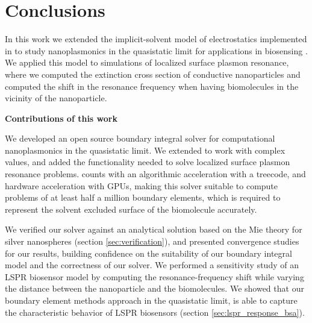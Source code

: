 \chapter{Conclusions}

In this work we extended the implicit-solvent model of electrostatics implemented in \pygbe \cite{CooperClementiBarba2015}
to study nanoplasmonics in the quasistatic limit for applications in biosensing \cite{ClementiETal2017, ClementiETal2019}.
We applied this model to simulations of localized surface plasmon resonance, where we computed the extinction cross section of 
conductive nanoparticles and computed the shift in the resonance frequency when having biomolecules in the vicinity of the 
nanoparticle.

\textbf{Contributions of this work}

We developed an open source boundary integral solver for computational nanoplasmonics in the quasistatic limit. We extended \pygbe to work 
with complex values, and added the functionality needed to solve localized surface plasmon resonance problems. \pygbe 
counts with an algorithmic acceleration with a treecode, and hardware acceleration with GPUs, making this solver 
suitable to compute problems of at least half a million boundary elements, which is required to represent the solvent excluded 
surface of the biomolecule accurately.

We verified our solver against an analytical solution based on the Mie theory for silver nanospheres (section \ref{sec:verification}), and 
presented convergence studies for our results, building confidence on the suitability of our boundary integral model and the  
correctness of our solver. We performed a sensitivity study of an LSPR biosensor model by computing the resonance-frequency shift
while varying the distance between the nanoparticle and the biomolecules. We showed that our boundary element methods approach in
the quasistatic limit, is able to capture the characteristic behavior of LSPR biosensors (section \ref{sec:lspr_response_bsa}).

